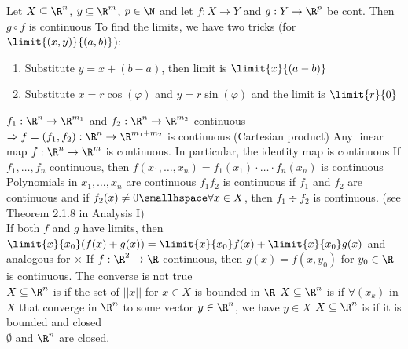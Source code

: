 \shortproposition Let $X \subseteq \R^n$, $y \subseteq \R^m$, $p \in \N$ and let $f: X \rightarrow Y$ and $g: Y \rightarrow \R^p$ be cont. Then $g \circ f$ is continuous
\numberingOff
\inlineremark To find the limits, we have two tricks (for $\limit{(x, y)}{(a, b)}$):
\rmvspace
\begin{enumerate}[noitemsep]
    \item {} Substitute $y = x + (b - a)$, then limit is $\limit{x}{(a - b)}$
    \item {} Substitute $x = r \cos(\varphi)$ and $y = r \sin(\varphi)$ and the limit is $\limit{r}{0}$
\end{enumerate}

\numberingOn\rmvspace
\shortex {} $f_1 : \R^n \rightarrow \R^{m_1}$ and $f_2 : \R^n \rightarrow \R^{m_2}$ continuous
$\Rightarrow f = (f_1, f_2): \R^n \rightarrow \R^{m_1 + m_2}$ is continuous (Cartesian product)
 Any linear map $f: \R^n \rightarrow \R^m$ is continuous. In particular, the identity map is continuous
 If $f_1, \ldots, f_n$ continuous, then $f(x_1, \ldots, x_n) = f_1(x_1) \cdot \ldots \cdot f_n(x_n)$ is continuous
 Polynomials in $x_1, \ldots, x_n$ are continuous
 $f_1f_2$ is continuous if $f_1$ and $f_2$ are continuous and if $f_2(x) \neq 0 \smallhspace \forall x \in X$, then $f_1 \div f_2$ is continuous.
(see Theorem 2.1.8 in Analysis I)\\
 If both $f$ and $g$ have limits, then $\displaystyle \limit{x}{x_0}(f(x) + g(x)) = \limit{x}{x_0} f(x) + \limit{x}{x_0} g(x)$ and analogous for $\times$
 If $f: \R^2 \rightarrow \R$ continuous, then $g(x) = f(x, y_0)$ for $y_0 \in \R$ is continuous. The converse is not true\\
\shortdef {} $X \subseteq \R^n$ is  if the set of $||x||$ for $x \in X$ is bounded in $\R$
 $X \subseteq \R^n$ is  if $\forall (x_k)$ in $X$ that converge in $\R^n$ to some vector $y \in \R^n$, we have $y \in X$
 $X \subseteq \R^n$ is  if it is bounded and closed\\
\shortex {} $\emptyset$ and $\R^n$ are closed.
